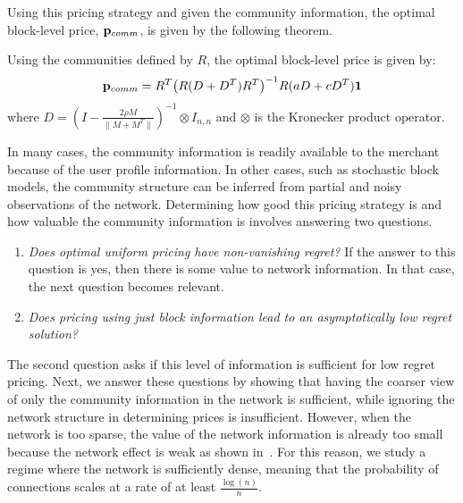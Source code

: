 Using this pricing strategy and given the community information, the optimal block-level price, $\mathbf{p}_{comm}$, is given by the following theorem. 
\begin{theorem}\label{prop:group_pricing}
    Using the communities defined by $R$, the optimal block-level price is given by:
    \newcommand{\D}{D}
    \begin{equation*}
        \mathbf{p}_{comm} = R^T {\left( R (D+D^T) R^T\right)}^{-1} R (a D + cD^T) \mathbf{1} 
    \end{equation*}
    where $D = {\left( I - \frac{2\rho M}{\| M+M^T\|}\right)}^{-1} \otimes I_{n,n} $ and $\otimes $ is the Kronecker product operator.
\end{theorem}

 In many cases, the community information is readily available to the merchant because of the user profile information. In other cases, such as stochastic block models, the community structure can be inferred from partial and noisy observations of the network. Determining how good this pricing strategy is and how valuable the community information is involves answering two questions.
\begin{enumerate}
    \item \emph{Does optimal uniform pricing have non-vanishing regret?} If the answer to this question is yes, then there is some value to network information. In that case, the next question becomes relevant.
    \item \emph{Does pricing using just block information lead to an asymptotically low regret solution?}
\end{enumerate}
The second question asks if this level of information is sufficient for low regret pricing. Next, we answer these questions by showing that having the coarser view of only the community information in the network is sufficient, while ignoring the network structure in determining prices is insufficient. However, when the network is too sparse, the value of the network information is already too small because the network effect is weak as shown in~\cite{huang2022value}. For this reason, we study a regime where the network is sufficiently dense, meaning that the probability of connections scales at a rate of at least $\frac{\log(n)}{n}$.  

